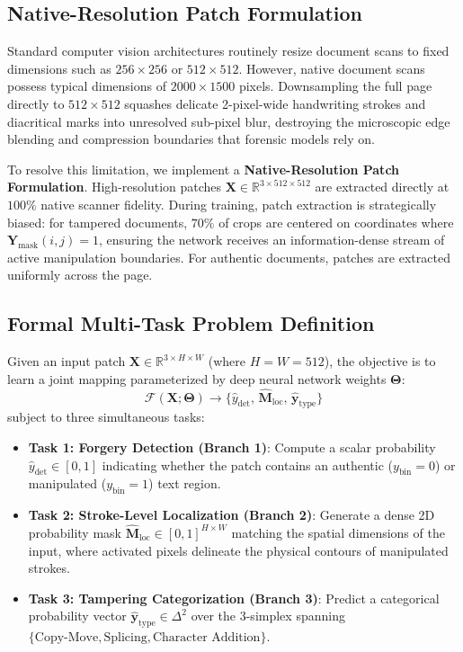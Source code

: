 \documentclass[pdflatex,sn-mathphys-num,iicol]{sn-jnl}
\begin{document}
\subsection{Native-Resolution Patch Formulation}\label{subsec3_5}
Standard computer vision architectures routinely resize document scans to fixed dimensions such as $256 \times 256$ or $512 \times 512$. However, native document scans possess typical dimensions of $2000 \times 1500$ pixels. Downsampling the full page directly to $512 \times 512$ squashes delicate 2-pixel-wide handwriting strokes and diacritical marks into unresolved sub-pixel blur, destroying the microscopic edge blending and compression boundaries that forensic models rely on.

To resolve this limitation, we implement a \textbf{Native-Resolution Patch Formulation}. High-resolution patches $\mathbf{X} \in \mathbb{R}^{3 \times 512 \times 512}$ are extracted directly at $100\%$ native scanner fidelity. During training, patch extraction is strategically biased: for tampered documents, $70\%$ of crops are centered on coordinates where $\mathbf{Y}_{\text{mask}}(i, j) = 1$, ensuring the network receives an information-dense stream of active manipulation boundaries. For authentic documents, patches are extracted uniformly across the page.

\subsection{Formal Multi-Task Problem Definition}\label{subsec3_6}
Given an input patch $\mathbf{X} \in \mathbb{R}^{3 \times H \times W}$ (where $H = W = 512$), the objective is to learn a joint mapping parameterized by deep neural network weights $\boldsymbol{\Theta}$:
\begin{equation}
\mathcal{F}(\mathbf{X}; \boldsymbol{\Theta}) \longrightarrow \{\hat{y}_{\text{det}}, \, \hat{\mathbf{M}}_{\text{loc}}, \, \hat{\mathbf{y}}_{\text{type}}\}\label{eq_problem}
\end{equation}
subject to three simultaneous tasks:
\begin{itemize}
    \item \textbf{Task 1: Forgery Detection (Branch 1)}: Compute a scalar probability $\hat{y}_{\text{det}} \in [0, 1]$ indicating whether the patch contains an authentic ($y_{\text{bin}} = 0$) or manipulated ($y_{\text{bin}} = 1$) text region.
    \item \textbf{Task 2: Stroke-Level Localization (Branch 2)}: Generate a dense 2D probability mask $\hat{\mathbf{M}}_{\text{loc}} \in [0, 1]^{H \times W}$ matching the spatial dimensions of the input, where activated pixels delineate the physical contours of manipulated strokes.
    \item \textbf{Task 3: Tampering Categorization (Branch 3)}: Predict a categorical probability vector $\hat{\mathbf{y}}_{\text{type}} \in \Delta^2$ over the 3-simplex spanning $\{\text{Copy-Move}, \text{Splicing}, \text{Character Addition}\}$.
\end{itemize}
\end{document}
